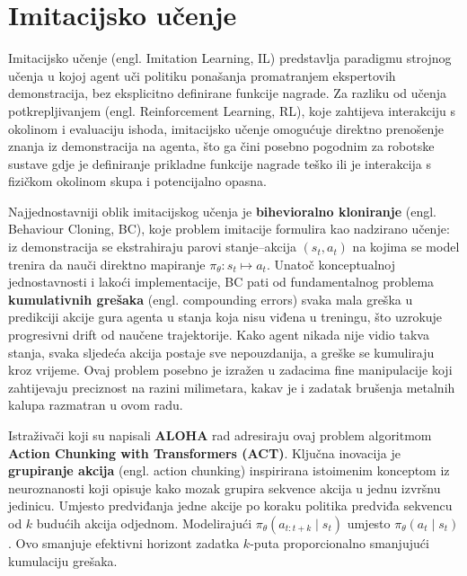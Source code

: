 \documentclass[times, utf8, diplomski]{fer}
\begin{document}
\section{Imitacijsko učenje}

Imitacijsko učenje (engl. Imitation Learning, IL) predstavlja paradigmu strojnog učenja u kojoj agent uči politiku ponašanja promatranjem ekspertovih demonstracija, bez eksplicitno definirane funkcije nagrade. Za razliku od učenja potkrepljivanjem (engl. Reinforcement Learning, RL), koje zahtijeva interakciju s okolinom i evaluaciju ishoda, imitacijsko učenje omogućuje direktno prenošenje znanja iz demonstracija na agenta, što ga čini posebno pogodnim za robotske sustave gdje je definiranje prikladne funkcije nagrade teško ili je interakcija s fizičkom okolinom skupa i potencijalno opasna.

Najjednostavniji oblik imitacijskog učenja je \textbf{bihevioralno kloniranje} (engl. Behaviour Cloning, BC), koje problem imitacije formulira kao nadzirano učenje: iz demonstracija se ekstrahiraju parovi stanje--akcija $(s_t, a_t)$ na kojima se model trenira da nauči direktno mapiranje $\pi_\theta: s_t \mapsto a_t$. Unatoč konceptualnoj jednostavnosti i lakoći implementacije, BC pati od fundamentalnog problema \textbf{kumulativnih grešaka} (engl. compounding errors) svaka mala greška u predikciji akcije gura agenta u stanja koja nisu viđena u treningu, što uzrokuje progresivni drift od naučene trajektorije. Kako agent nikada nije vidio takva stanja, svaka sljedeća akcija postaje sve nepouzdanija, a greške se kumuliraju kroz vrijeme. Ovaj problem posebno je izražen u zadacima fine manipulacije koji zahtijevaju preciznost na razini milimetara, kakav je i zadatak brušenja metalnih kalupa razmatran u ovom radu.

Istraživači koji su napisali \textbf{ALOHA} rad \cite{zhao2023aloha} adresiraju ovaj problem algoritmom \textbf{Action Chunking with Transformers (ACT)}. Ključna inovacija je \textbf{grupiranje akcija} (engl. action chunking) inspirirana istoimenim konceptom iz neuroznanosti koji opisuje kako mozak grupira sekvence akcija u jednu izvršnu jedinicu. Umjesto predviđanja jedne akcije po koraku politika predviđa sekvencu od $k$ budućih akcija odjednom. Modelirajući $\pi_\theta(a_{t:t+k} \mid s_t)$ umjesto $\pi_\theta(a_t \mid s_t)$. Ovo smanjuje efektivni horizont zadatka $k$-puta proporcionalno smanjujući kumulaciju grešaka.
\end{document}
